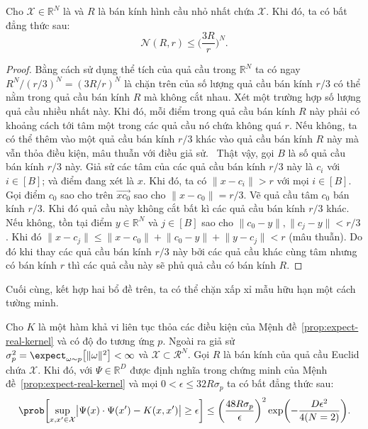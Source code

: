 \begin{lem}
  \label{lem:n-ball-bound}
  Cho $\mathcal{X} \in \mathbb{R}^N$ là  và $R$ là bán kính hình
  cầu nhỏ nhất chứa $\mathcal{X}$. Khi đó, ta có bất đẳng thức sau:
  \begin{equation}
    \mathcal{N}(R, r) \le \biggl( \frac{3R}{r} \biggr )^N.
  \end{equation}
\end{lem}

\begin{proof}
  Bằng cách sử dụng thể tích của quả cầu trong $\mathbb{R}^N$ ta có ngay $R^N /
  (r / 3)^N = (3R / r)^N$ là chặn trên của số lượng quả cầu bán kính $r/3$ có
  thể nằm trong quả cầu bán kính $R$ mà không cắt nhau. Xét một trường hợp số
  lượng quả cầu nhiều nhất này. Khi đó, mỗi điểm trong quả cầu bán kính $R$ này
  phải có khoảng cách tới tâm một trong các quả cầu nó chứa không quá $r$. Nếu
  không, ta có thể thêm vào một quả cầu bán kính $r/3$ khác vào quả cầu bán
  kính $R$ này mà vẫn thỏa điều kiện, mâu thuẫn với điều giả sử. \elaborate\
  Thật vậy, gọi $B$ là số quả cầu bán kính $r/3$ này. Giả sử các tâm của các
  quả cầu bán kính $r/3$ này là $c_i$ với $i \in [B]$; và điểm đang xét là $x$.
  Khi đó, ta có $\lVert x - c_i \rVert > r$ với mọi $i \in [B]$. Gọi điểm $c_0$
  sao cho trên \tr{vector} $\overrightarrow{xc_0}$ sao cho $\lVert x - c_0
  \rVert = r/3$.  Vẽ quả cầu tâm $c_0$ bán kính $r/3$. Khi đó quả cầu này không
  cắt bất kì các quả cầu bán kính $r/3$ khác. Nếu không, tồn tại điểm $y \in
  \mathbb{R}^N$ và $j \in [B]$ sao cho $\lVert c_0 - y \rVert, \lVert c_j - y
  \rVert < r/3$. Khi đó $\lVert x - c_j \rVert \le \lVert x - c_0 \rVert +
  \lVert c_0 - y \rVert + \lVert y - c_j \rVert < r$ (mâu thuẫn). Do đó khi
  thay các quả cầu bán kính  $r/3$ này bởi các quả cầu khác cùng tâm nhưng có
  bán kính $r$ thì các quả cầu này sẽ phủ quả cầu có bán kính $R$.
\end{proof}

Cuối cùng, kết hợp hai bổ đề trên, ta có thể chặn xấp xỉ mẫu hữu hạn một cách
tường minh.

\begin{thm}
  Cho $K$ là một hàm  khả vi liên tục thỏa các điều kiện của Mệnh
  đề~\ref{prop:expect-real-kernel} và có độ đo tương ứng $p$. Ngoài ra giả sử
  $\sigma_p^2 = \expect_{\omega \sim p}\bigl[ \lVert \omega \rVert^2 \bigr ] <
  \infty$ và $\mathcal{X} \subset \mathcal{R}^N$. Gọi $R$ là bán kính của quả
  cầu Euclid chứa $\mathcal{X}$. Khi đó, với $\Psi \in \mathbb{R}^D$ được định
  nghĩa trong chứng minh của Mệnh đề~\ref{prop:expect-real-kernel} và mọi $0 <
  \epsilon \le 32R\sigma_p$ ta có bất đẳng thức sau: \begin{equation}
    \prob \biggl[ \sup_{x, x' \in \mathcal{X}} \bigl\lvert \Psi(x) \cdot
    \Psi(x') - K(x, x') \bigr\rvert \ge \epsilon \biggr ] \le \biggl(
    \frac{48R\sigma_p}{\epsilon}\biggr )^2\exp\biggl( - \frac{D\epsilon^2}{4(N
    = 2)} \biggr ).
  \end{equation}
\end{thm}

